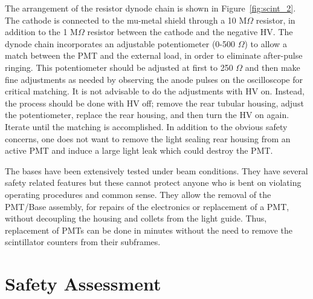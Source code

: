 {  
  The arrangement of the resistor dynode chain is shown in 
  Figure~\ref{fig:scint_2}. The 
  cathode is connected to the mu-metal shield through a 10 M$\Omega$ resistor, in
  addition to the 1 M$\Omega$ resistor between the cathode and the negative HV. The
  dynode chain incorporates an adjustable potentiometer (0-500 $\Omega$) to allow a
  match between the PMT and the external load, in order to eliminate after-pulse
  ringing.  This potentiometer should be adjusted at first to 250 $\Omega$ and then
  make fine adjustments as needed by observing the anode pulses on the
  oscilloscope for critical matching. It is not advisable to do the adjustments
  with HV on. Instead, the process should be done with HV off; remove the rear
  tubular housing, adjust the potentiometer, replace the rear housing, and then
  turn the HV on again. Iterate until the matching is accomplished. In addition to the
  obvious safety concerns, one does not want to remove the light sealing rear
  housing from an active PMT and induce a large light leak which could destroy
  the PMT. 
  
  The bases have been extensively tested under beam conditions. 
  They have several safety related features but these cannot protect anyone who 
  is bent on violating operating procedures and common sense. They allow the 
  removal of the PMT/Base assembly, for repairs of the electronics or replacement 
  of a PMT, without decoupling the housing and collets from the light guide. 
  Thus, replacement of PMTs can be done in minutes without the need to remove the 
  scintillator counters from their subframes.
}

\section{Safety Assessment}
  
